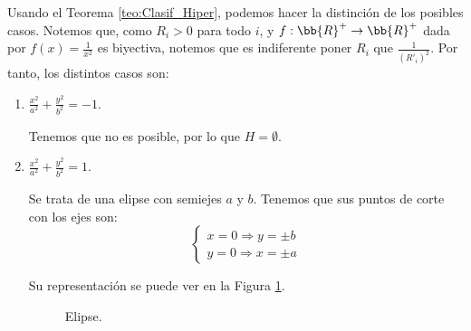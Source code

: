 Usando el Teorema \ref{teo:Clasif_Hiper}, podemos hacer la distinción de los posibles casos. Notemos que, como $R_i>0$ para todo $i$, y $f:\bb{R}^+\to \bb{R}^+$ dada por $f(x)=\frac{1}{x^2}$ es biyectiva, notemos que es indiferente poner $R_i$ que $\frac{1}{(R'_i)^2}$. Por tanto, los distintos casos son:
\begin{enumerate}
    \item $\displaystyle \frac{x^2}{a^2} + \frac{y^2}{b^2} = -1$.

    Tenemos que no es posible, por lo que $H=\emptyset$. 
    
    \item $\displaystyle \frac{x^2}{a^2} + \frac{y^2}{b^2} = 1$.

    Se trata de una elipse con semiejes $a$ y $b$. Tenemos que sus puntos de corte con los ejes son:
    \begin{equation*}
        \left\{\begin{array}{l}
            x=0 \Longrightarrow y=\pm b  \\
            y=0 \Longrightarrow x=\pm a
        \end{array}\right.
    \end{equation*}

    Su representación se puede ver en la Figura \ref{fig:Elipse}.
    \begin{figure}
        \centering
            \caption{Elipse.}
            \label{fig:Elipse}
    \end{figure}
    

\end{enumerate}
